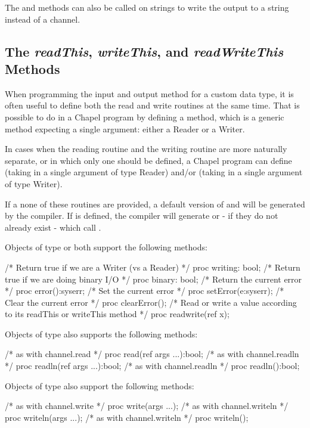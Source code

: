 The  and  methods can also be called on
strings to write the output to a string instead of a channel.




\subsection{The {\em readThis}, {\em writeThis}, and {\em readWriteThis} Methods}

\label{User_Defined_writeThis_Methods}

When programming the input and output method for a custom data type, it is often useful to define both the read and write routines at the same time. That is possible to do in a Chapel program by defining a  method, which is a generic method expecting a single argument: either a Reader or a Writer.

In cases when the reading routine and the writing routine are more naturally separate, or in which only one should be defined, a Chapel program can define  (taking in a single argument of type Reader) and/or  (taking in a single argument of type Writer). 

If a none of these routines are provided, a default version of  and  will be generated by the compiler. If  is defined, the compiler will generate  or  - if they do not already exist - which call .

Objects of type  or  both support the following methods:
\begin{chapel}
  /* Return true if we are a Writer (vs a Reader) */
  proc writing: bool;
  /* Return true if we are doing binary I/O */
  proc binary: bool;
  /* Return the current error */
  proc error():syserr;
  /* Set the current error */
  proc setError(e:syserr);
  /* Clear the current error */
  proc clearError();
  /* Read or write a value according to its readThis or writeThis method */
  proc readwrite(ref x);
\end{chapel}

Objects of type  also supports the following methods:
\begin{chapel}
  /* as with channel.read */
  proc read(ref args ...):bool;
  /* as with channel.readln */
  proc readln(ref args ...):bool;
  /* as with channel.readln */
  proc readln():bool;
\end{chapel}
Objects of type  also support the following methods:
\begin{chapel}
  /* as with channel.write */
  proc write(args ...);
  /* as with channel.writeln */
  proc writeln(args ...);
  /* as with channel.writeln */
  proc writeln();
\end{chapel}

